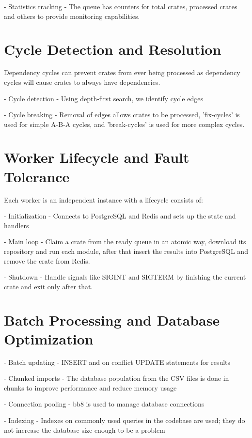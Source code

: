 - Statistics tracking - The queue has counters for total crates, processed crates and others to provide monitoring capabilities.

\section{Cycle Detection and Resolution}\label{sect:cycle-detection}

Dependency cycles can prevent crates from ever being processed as dependency cycles will cause crates to always have dependencies.

- Cycle detection - Using depth-first search, we identify cycle edges

- Cycle breaking - Removal of edges allows crates to be processed, 'fix-cycles' is used for simple A-B-A cycles, and 'break-cycles' is used for more complex cycles.

\section{Worker Lifecycle and Fault Tolerance}\label{sect:worker-lifecycle}

Each worker is an independent instance with a lifecycle consists of:

- Initialization - Connects to PostgreSQL and Redis and sets up the state and handlers

- Main loop - Claim a crate from the ready queue in an atomic way, download its repository and run each module, after that insert the results into PostgreSQL and remove the crate from Redis.

- Shutdown - Handle signals like SIGINT and SIGTERM by finishing the current crate and exit only after that.

\section{Batch Processing and Database Optimization}\label{sect:batch-db-opt}

- Batch updating - INSERT and on conflict UPDATE statements for results

- Chunked imports - The database population from the CSV files is done in chunks to improve performance and reduce memory usage

- Connection pooling - bb8 is used to manage database connections

- Indexing - Indexes on commonly used queries in the codebase are used; they do not increase the database size enough to be a problem